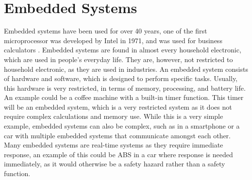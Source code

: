 \section{Embedded Systems}
\label{section:embedded-systems}
Embedded systems have been used for over 40 years, one of the first microprocessor was developed by Intel in 1971, and was used for business calculators \citep{book:embedded-system}.
Embedded systems are found in almost every household electronic, which are used in people's everyday life.
They are, however, not restricted to household electronic, as they are used in industries.
An embedded system consists of hardware and software, which is designed to perform specific tasks.
Usually, this hardware is very restricted, in terms of memory, processing, and battery life.  
An example could be a coffee machine with a built-in timer function.
This timer will be an embedded system, which is a very restricted system as it does not require complex calculations and memory use.
While this is a very simple example, embedded systems can also be complex, such as in a smartphone or a car with multiple embedded systems that communicate amongst each other. 
Many embedded systems are real-time systems as they require immediate response, an example of this could be ABS in a car where response is needed immediately, as it would otherwise be a safety hazard rather than a safety function.